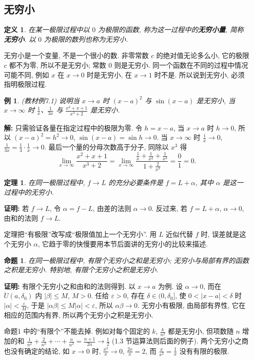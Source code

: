 \documentclass[UTF8,openany]{ctexbook}
\theoremstyle{chinesetextbook}
\newtheorem{definition}{定义}[section]
\newtheorem{example}{例}[section]
\newtheorem{proposition}{命题}[section]
\newenvironment{cnproof}{\par\indent\textbf{证明:} \ignorespaces}{\par}
\newenvironment{cnsolution}{\par\indent\textbf{解:} \ignorespaces}{\par}
\newtheorem*{theoremsingle}{定理}
\begin{document}
\subsection{无穷小}
\begin{definition}
在某一极限过程中以 $0$ 为极限的函数, 称为这一过程中的\textbf{无穷小量}, 简称\textbf{无穷小}. 以 $0$ 为极限的数列也称为无穷小.
\end{definition}
无穷小是一个变量, 不是一个很小的数. 非零常数 $c$ 的绝对值无论多么小, 它的极限 $c$ 都不为零, 所以不是无穷小; 常数 $0$ 则是无穷小. 同一个函数在不同的过程中情况可能不同, 例如 $x$ 在 $x\to0$ 时是无穷小, 在 $x\to1$ 时不是. 所以说到无穷小, 必须指明极限过程.
\begin{example}
\textnormal{(教材例7.1)} 说明当 $x\to a$ 时 $(x-a)^2$ 与 $\sin(x-a)$ 是无穷小, 当 $x\to\infty$ 时 $\displaystyle\frac1x$、$\displaystyle\frac1{3x}$ 与 $\displaystyle\frac{x^2+x+1}{x^3+2}$ 是无穷小.
\end{example}
\begin{cnsolution}
只需验证各量在指定过程中的极限为零. 令 $h=x-a$, 当 $x\to a$ 时 $h\to0$, 所以 $(x-a)^2=h^2\to0$, $\sin(x-a)=\sin h\to0$. 当 $x\to\infty$ 时 $\displaystyle\frac1x\to0$, $\displaystyle\frac1{3x}=\frac13\cdot\frac1x\to0$. 最后一个量的分母次数高于分子, 同除以 $x^3$ 得
\[
\lim_{x\to\infty}\frac{x^2+x+1}{x^3+2}=\lim_{x\to\infty}\frac{\frac1x+\frac1{x^2}+\frac1{x^3}}{1+\frac2{x^3}}=\frac01=0.
\]
\end{cnsolution}
\begin{theoremsingle}
在同一极限过程中, $f\to L$ 的充分必要条件是 $f=L+\alpha$, 其中 $\alpha$ 是这一过程中的无穷小.
\end{theoremsingle}
\begin{cnproof}
若 $f\to L$, 令 $\alpha=f-L$, 由差的法则 $\alpha\to0$. 反过来, 若 $f=L+\alpha$, $\alpha\to0$, 由和的法则 $f\to L$.
\end{cnproof}
定理把“有极限”改写成“极限值加上一个无穷小”. 用 $L$ 近似代替 $f$ 时, 误差就是这个无穷小 $\alpha$, 它趋于零的快慢要用本节后面讲的无穷小的比较来描述.
\begin{proposition}
在同一极限过程中, 有限个无穷小之和是无穷小; 无穷小与局部有界的函数之积是无穷小. 特别地, 有限个无穷小之积是无穷小.
\end{proposition}
\begin{cnproof}
有限个无穷小之和由和的法则得到. 以 $x\to a$ 为例. 设 $\alpha\to0$, 而在 $\mathring U(a,\delta_0)$ 内 $|\beta|\le M$, $M>0$. 任给 $\varepsilon>0$, 存在 $\delta\in(0,\delta_0]$, 使 $0<|x-a|<\delta$ 时 $\displaystyle|\alpha|<\frac\varepsilon M$, 于是 $|\alpha\beta|\le M|\alpha|<\varepsilon$, 所以 $\alpha\beta\to0$. 无穷小有极限, 由局部有界性, 它在相应的范围内有界, 所以两个无穷小之积是无穷小.
\end{cnproof}
命题1 中的“有限个”不能去掉. 例如对每个固定的 $k$, $\displaystyle\frac k{n^2}$ 都是无穷小, 但项数随 $n$ 增加的和 $\displaystyle\frac1{n^2}+\frac2{n^2}+\cdots+\frac n{n^2}=\frac{n+1}{2n}\to\frac12$ (1.3 节运算法则后面的例子). 两个无穷小之商也没有确定的结论, 如 $x\to0$ 时, $\displaystyle\frac{x^2}x\to0$, $\displaystyle\frac{2x}x=2$, 而 $\displaystyle\frac x{x^2}=\frac1x$ 没有有限的极限.
\end{document}
